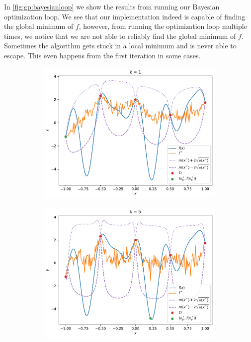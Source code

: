 In \cref{fig:gp:bayesianloop} we show the results from running our Bayesian optimization loop. We see that our implementation indeed is capable of finding the global minimum of $f$,
however, from running the optimization loop multiple times, we notice that we are not able to reliably find the global minimum of $f$. Sometimes the algorithm gets stuck in a local minimum and is never able to escape. This even happens from the first iteration in some cases.

\begin{figure}[H]
    \begin{subfigure}[t]{0.49\textwidth}
        \centering
        \includegraphics[width=\textwidth]{figures/gp/b2-k_1.pdf}
    \end{subfigure}
    \hfill
    \begin{subfigure}[t]{0.49\textwidth}
        \centering
        \includegraphics[width=\textwidth]{figures/gp/b2-k_5.pdf}
    \end{subfigure}


\end{figure}
